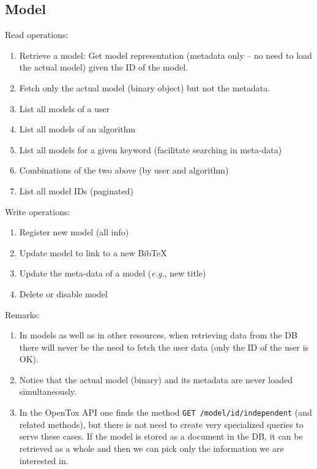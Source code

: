 \subsection{Model}

\noindent Read operations:
\begin{enumerate}
 \item Retrieve a model: Get model representation (metadata only -- 
       no need to load the actual model) given the ID of the model.
 \item Fetch only the actual model (binary object) but not the metadata. 
 \item List all models of a user
 \item List all models of an algorithm 
 \item List all models for a given keyword (facilitate searching in meta-data)
 \item Combinations of the two above (by user and algorithm)
 \item List all model IDs (paginated)
\end{enumerate}


\noindent Write operations:
\begin{enumerate}
 \item Register new model (all info)
 \item Update model to link to a new BibTeX
 \item Update the meta-data of a model (\textit{e.g.}, new title)
 \item Delete or disable model 
\end{enumerate}


\noindent Remarks:
\begin{enumerate}
 \item In models as well as in other resources, when retrieving data from the 
       DB there will never be the need to fetch the user data (only the ID 
       of the user is OK).
 \item Notice that the actual model (binary) and its metadata are never loaded simultaneously.
 \item In the OpenTox API one finds the method \texttt{GET /model/{id}/independent} 
       (and related methods), but there is not need to create very specialized 
       queries to serve these cases. If the model is stored as a document in the DB, 
       it can be retrieved as a whole and then we can pick only the information we are interested in.
\end{enumerate}





